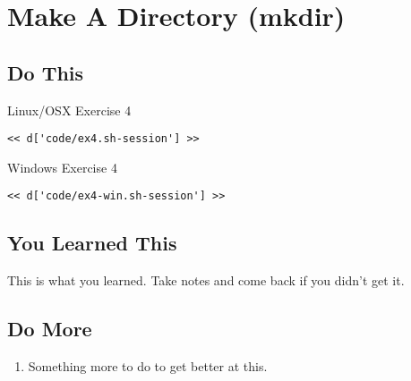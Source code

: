 \chapter{Make A Directory (mkdir)}

\section{Do This}

\begin{code}{Linux/OSX Exercise 4}
\begin{Verbatim}
<< d['code/ex4.sh-session'] >>
\end{Verbatim}
\end{code}

\begin{code}{Windows Exercise 4}
\begin{Verbatim}
<< d['code/ex4-win.sh-session'] >>
\end{Verbatim}
\end{code}

\section{You Learned This}

This is what you learned.  Take notes and come back if you didn't get it.

\section{Do More}

\begin{enumerate}
\item Something more to do to get better at this.
\end{enumerate}


